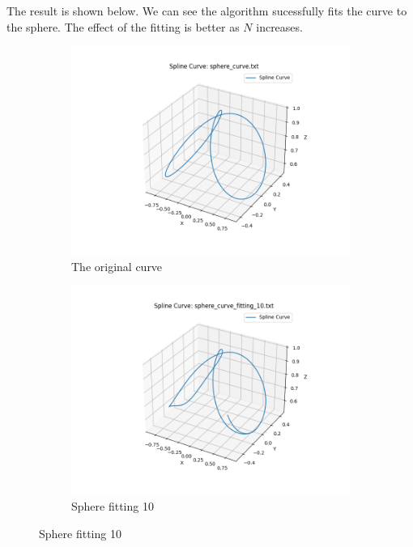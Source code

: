 \documentclass[a4paper]{article}
\begin{document}
The result is shown below. We can see the algorithm sucessfully fits the curve to the sphere. The effect of the fitting is better as $N$ increases.
\begin{figure}[htbp]
  \centering
  \begin{subfigure}[t]{0.45\textwidth}
      \centering
      \includegraphics[width=\textwidth]{figures/sphere/sphere_curve.png}
      \caption*{The original curve}
  \end{subfigure}
  \hfill
  \begin{subfigure}[t]{0.45\textwidth}
      \centering
      \includegraphics[width=\textwidth]{figures/sphere/sphere_curve_fitting_10.png}
      \caption*{Sphere fitting 10}
  \end{subfigure}


\end{figure}
\end{document}
